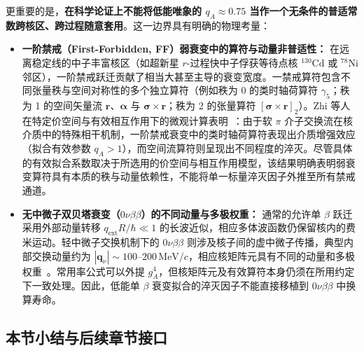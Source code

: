 更重要的是，\textbf{在科学论证上不能将低能唯象的 $q_A \approx 0.75$ 当作一个无条件的普适常数跨核区、跨过程随意套用}。这一边界具有明确的物理考量：
\begin{itemize}
\item \textbf{一阶禁戒（First-Forbidden, FF）弱衰变中的算符与动量非普适性：}
在远离稳定线的中子丰富核区（如超新星 $r$-过程快中子俘获等待点核 $^{130}\mathrm{Cd}$ 或 $^{78}\mathrm{Ni}$ 邻区），一阶禁戒跃迁贡献了相当大甚至主导的衰变宽度。一禁戒算符包含不同张量秩与空间对称性的多个独立算符（例如秩为 0 的类时轴荷算符 $\gamma_5$；秩为 1 的空间矢量流 $\mathbf{r}$、$\boldsymbol{\alpha}$ 与 $\boldsymbol{\sigma}\times\mathbf{r}$；秩为 2 的张量算符 $[\boldsymbol{\sigma} \times \mathbf{r}]_2$）。Zhi 等人在特定价空间与有效相互作用下的微观计算表明~\cite{doctoral-r1-g34-zhi-2013-prc-shell-model-half-lives}：由于软 $\pi$ 介子交换流在核介质中的特殊相干机制，一阶禁戒衰变中的类时轴荷算符表现出介质增强效应（拟合有效参数 $q_A > 1$），而空间流算符则呈现出不同程度的淬灭。尽管具体的有效拟合系数取决于所选用的价空间与相互作用模型，该结果明确表明弱衰变算符具有本质的秩与动量依赖性，不能将单一标量淬灭因子外推至所有禁戒通道。
\item \textbf{无中微子双贝塔衰变（$0\nu\beta\beta$）的不同动量与多极权重：}
通常的允许单 $\beta$ 跃迁采用外部动量转移 $q_{\mathrm{ext}}R/\hbar\ll1$ 的长波近似，相应多体波函数仍保留核内的费米运动。轻中微子交换机制下的 $0\nu\beta\beta$ 则涉及核子间的虚中微子传播，典型内部交换动量约为 $|\mathbf q_\nu|\sim100\text{--}200\,\mathrm{MeV}/c$，相应核矩阵元具有不同的动量和多极权重~\cite{engel-menendez-2017-double-beta-matrix-elements-review}。常用率公式可以外提 $g_A^4$，但核矩阵元及有效算符本身仍须在所用约定下一致处理。因此，低能单 $\beta$ 衰变拟合的淬灭因子不能直接移植到 $0\nu\beta\beta$ 中换算寿命。
\end{itemize}

\subsection{本节小结与后续章节接口}\label{sec:2-7-6}

